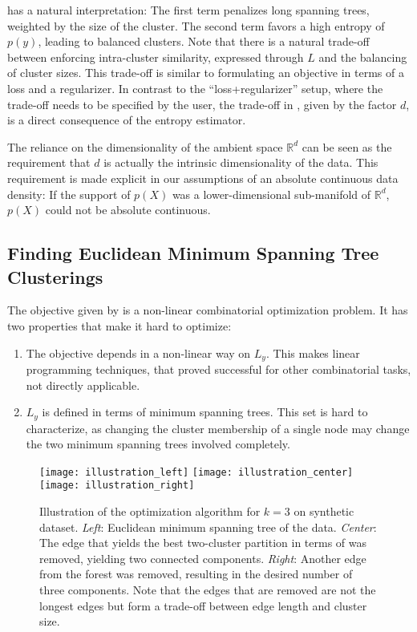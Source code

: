  has a natural interpretation: The first term
penalizes long spanning trees, weighted by the size of the cluster. The second
term favors a high entropy of $p(y)$, leading to balanced clusters. Note that
there is a natural trade-off between enforcing intra-cluster similarity,
expressed through $L$ and the balancing of cluster sizes. This trade-off is
similar to formulating an objective in terms of a loss and a regularizer. In
contrast to the ``loss+regularizer'' setup, where the trade-off needs to be
specified by the user, the trade-off in , given by
the factor $d$, is a direct consequence of the entropy estimator.

The reliance on the dimensionality of the ambient space $\mathbb{R}^d$ can be
seen as the requirement that $d$ is actually the intrinsic dimensionality of
the data.
This requirement is made explicit in our assumptions of an absolute continuous
data density: If the support of $p(X)$ was a lower-dimensional sub-manifold of
$\mathbb{R}^d$, $p(X)$ could not be absolute continuous.

\subsection{Finding Euclidean Minimum Spanning Tree Clusterings}
The objective given by  is a non-linear combinatorial
optimization problem. It has two properties that make it hard to optimize:
\begin{enumerate}
    \item The objective depends in a non-linear way on $L_y$.
        This makes linear programming techniques, that proved successful for
        other combinatorial tasks, not directly applicable.
    \item $L_y$ is defined in terms of minimum spanning trees. This set is hard
        to characterize, as changing the cluster membership of a single node may change
        the two minimum spanning trees involved completely.
\end{enumerate}

\begin{figure}
\centering
\texttt{[image: illustration\_left]}
\texttt{[image: illustration\_center]}
\texttt{[image: illustration\_right]}
\caption{Illustration of the optimization algorithm for $k=3$ on synthetic
dataset. \emph{Left}: Euclidean minimum spanning tree of the data.
\emph{Center}: The edge that yields the best two-cluster partition in terms of
 was removed, yielding two connected components. \emph{Right}:
Another edge from the forest was removed, resulting in the desired number of
three components. Note that the edges that are removed are not the longest edges
but form a trade-off between edge length and cluster size.}
\label{fig:illustration}
\end{figure}

